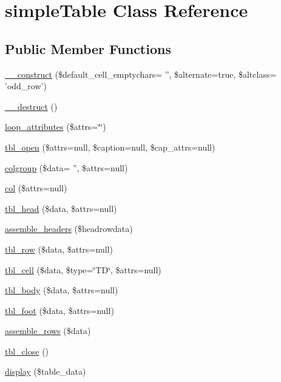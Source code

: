 \hypertarget{classsimple_table}{\section{simple\-Table Class Reference}
\label{classsimple_table}
}
\subsection*{Public Member Functions}
\begin{DoxyCompactItemize}
\item 
\hyperlink{classsimple_table_a6c9ec5f57e3a9f2b5e9be12e9535fbd4}{\-\_\-\-\_\-construct} (\$default\-\_\-cell\-\_\-emptychars= '', \$alternate=true, \$altclass= 'odd\-\_\-row')
\item 
\hyperlink{classsimple_table_a421831a265621325e1fdd19aace0c758}{\-\_\-\-\_\-destruct} ()
\item 
\hyperlink{classsimple_table_a846403917c32311cf3d6a4168c2270cf}{loop\-\_\-attributes} (\$attrs=\char`\"{}\char`\"{})
\item 
\hyperlink{classsimple_table_ae4ebee8bff57e01ccda5c08bd842c6ee}{tbl\-\_\-open} (\$attrs=null, \$caption=null, \$cap\-\_\-attrs=null)
\item 
\hyperlink{classsimple_table_a7cc27ba70ada221c62b29567936bc4bd}{colgroup} (\$data= '', \$attrs=null)
\item 
\hyperlink{classsimple_table_af5144d356c43f2d682fae92ec404ec09}{col} (\$attrs=null)
\item 
\hyperlink{classsimple_table_a2e783d81dd081e73d196ef0c11f3c62d}{tbl\-\_\-head} (\$data, \$attrs=null)
\item 
\hyperlink{classsimple_table_a960b0a5714263a08c400b715afbbb526}{assemble\-\_\-headers} (\$headrowdata)
\item 
\hyperlink{classsimple_table_a51225e4e6848623331be597a806de439}{tbl\-\_\-row} (\$data, \$attrs=null)
\item 
\hyperlink{classsimple_table_a31e7c9b05a29c57fc00804183ce3e832}{tbl\-\_\-cell} (\$data, \$type=\char`\"{}T\-D\char`\"{}, \$attrs=null)
\item 
\hyperlink{classsimple_table_a3831c39c25c0542d2dd8452a62b67f68}{tbl\-\_\-body} (\$data, \$attrs=null)
\item 
\hyperlink{classsimple_table_a756c74b48b38b58e8e1a8bea60593961}{tbl\-\_\-foot} (\$data, \$attrs=null)
\item 
\hyperlink{classsimple_table_a9e5c9a1c37d8b5c41f2dfeeca978ee5e}{assemble\-\_\-rows} (\$data)
\item 
\hyperlink{classsimple_table_a25674bc8e9cf30d3a569412f4a831f94}{tbl\-\_\-close} ()
\item 
\hyperlink{classsimple_table_a9edf4f2db25b0415fc7c2c0b1309285d}{display} (\$table\-\_\-data)
\end{DoxyCompactItemize}


